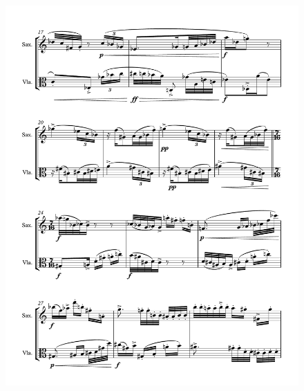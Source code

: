 \begin{figure}[htbp]
    \centering
	\includegraphics[width=6.5in]{figures/Sax_Viola_23.pdf}
\end{figure}


